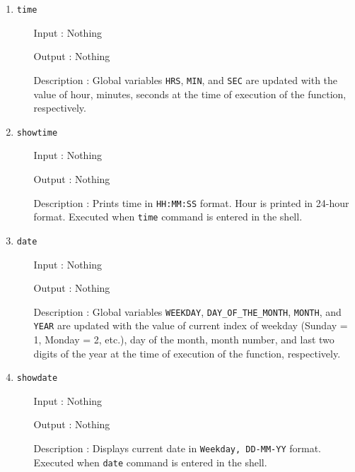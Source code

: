 \begin{enumerate}
  \item \texttt{time}
  		\begin{enumerate}[align=parleft, labelsep=2cm, leftmargin=1.06in]
  		  \item[Input]: Nothing
  		  \item[Output]: Nothing
  		  \item[Description]: Global variables \texttt{HRS}, \texttt{MIN}, and \texttt{SEC} are updated with the value of hour, minutes, seconds at the time of execution of the function, respectively.
  		\end{enumerate}
  \item \texttt{showtime}
  		\begin{enumerate}[align=parleft, labelsep=2cm, leftmargin=1.06in]
  		  \item[Input]: Nothing
  		  \item[Output]: Nothing
  		  \item[Description]: Prints time in \texttt{HH:MM:SS} format. Hour is printed in 24-hour format. Executed when \texttt{time} command is entered in the shell.
  		\end{enumerate}
  \item \texttt{date}
  		\begin{enumerate}[align=parleft, labelsep=2cm, leftmargin=1.06in]
  		  \item[Input]: Nothing
  		  \item[Output]: Nothing
  		  \item[Description]: Global variables \texttt{WEEKDAY}, \texttt{DAY\_OF\_THE\_MONTH}, \texttt{MONTH}, and \texttt{YEAR} are updated with the value of current index of weekday (Sunday = 1, Monday = 2, etc.), day of the month, month number, and last two digits of the year at the time of execution of the function, respectively.
  		\end{enumerate}
  \item \texttt{showdate}
  		\begin{enumerate}[align=parleft, labelsep=2cm, leftmargin=1.06in]
  		  \item[Input]: Nothing
  		  \item[Output]: Nothing
  		  \item[Description]: Displays current date in \texttt{Weekday, DD-MM-YY} format. Executed when \texttt{date} command is entered in the shell.
  		\end{enumerate}
\end{enumerate}

